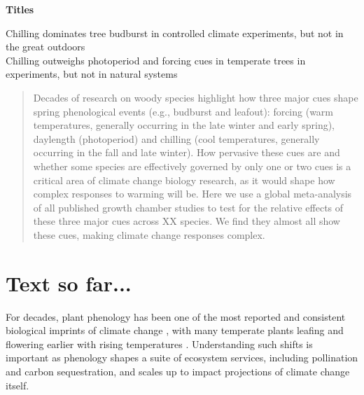 \documentclass[11pt,letter]{article}
\begin{document}
%

\renewcommand{\refname}{\CHead{}}


{\bf Titles}

Chilling dominates tree budburst in controlled climate experiments, but not in the great outdoors\\
Chilling outweighs photoperiod and forcing cues in temperate trees in experiments, but not in natural systems


\begin{abstract}
Decades of research on woody species highlight how three major cues shape spring phenological events (e.g., budburst and leafout): forcing (warm temperatures, generally occurring in the late winter and early spring), daylength (photoperiod) and chilling (cool temperatures, generally occurring in the fall and late winter). How pervasive these cues are and whether some species are effectively governed by only one or two cues is a critical area of climate change biology research, as it would shape how complex responses to warming will be. Here we use a global meta-analysis of all published growth chamber studies to test for the relative effects of these three major cues across XX species. We find they almost all show these cues, making climate change responses complex. 
\end{abstract}

\section* {Text so far...}

\par For decades, plant phenology has been one of the most reported and consistent biological imprints of climate change \citep{IPCC:2014sm}, with many temperate plants leafing and flowering earlier with rising temperatures \citep{millerrushing2008,menzel2006}. Understanding such shifts is important as phenology shapes a suite of ecosystem services, including pollination and carbon sequestration, and scales up to impact projections of climate change itself. 
\end{document}
